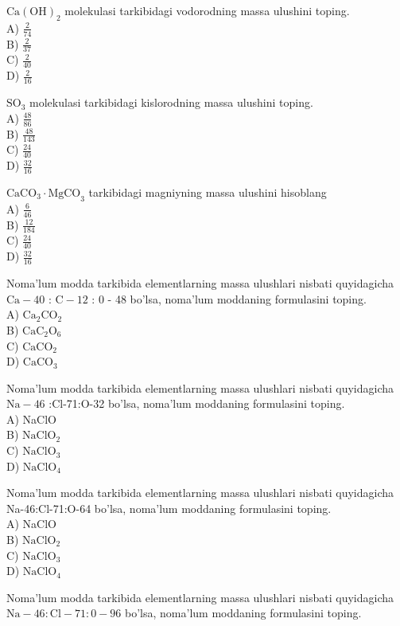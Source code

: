   \item $\mathrm{Ca}(\mathrm{OH})_{2}$ molekulasi tarkibidagi vodorodning massa ulushini toping.\\
A) $\frac{2}{74}$\\
B) $\frac{2}{37}$\\
C) $\frac{2}{40}$\\
D) $\frac{2}{16}$
  \item $\mathrm{SO}_{3}$ molekulasi tarkibidagi kislorodning massa ulushini toping.\\
A) $\frac{48}{86}$\\
B) $\frac{48}{143}$\\
C) $\frac{24}{40}$\\
D) $\frac{32}{16}$
  \item $\mathrm{CaCO}_{3} \cdot \mathrm{MgCO}_{3}$ tarkibidagi magniyning massa ulushini hisoblang\\
A) $\frac{6}{46}$\\
B) $\frac{12}{184}$\\
C) $\frac{24}{40}$\\
D) $\frac{32}{16}$
  \item Noma'lum modda tarkibida elementlarning massa ulushlari nisbati quyidagicha $\mathrm{Ca}-40$ : $\mathrm{C}-12$ : 0 - 48 bo'lsa, noma'lum moddaning formulasini toping.\\
A) $\mathrm{Ca}_{2} \mathrm{CO}_{2}$\\
B) $\mathrm{CaC}_{2} \mathrm{O}_{6}$\\
C) $\mathrm{CaCO}_{2}$\\
D) $\mathrm{CaCO}_{3}$
  \item Noma'lum modda tarkibida elementlarning massa ulushlari nisbati quyidagicha $\mathrm{Na}-46$ :Cl-71:O-32 bo'lsa, noma'lum moddaning formulasini toping.\\
A) NaClO\\
B) $\mathrm{NaClO}_{2}$\\
C) $\mathrm{NaClO}_{3}$\\
D) $\mathrm{NaClO}_{4}$
  \item Noma'lum modda tarkibida elementlarning massa ulushlari nisbati quyidagicha Na-46:Cl-71:O-64 bo'lsa, noma'lum moddaning formulasini toping.\\
A) NaClO\\
B) $\mathrm{NaClO}_{2}$\\
C) $\mathrm{NaClO}_{3}$\\
D) $\mathrm{NaClO}_{4}$
  \item Noma'lum modda tarkibida elementlarning massa ulushlari nisbati quyidagicha $\mathrm{Na}-46: \mathrm{Cl}-71: 0-96$ bo'lsa, noma'lum moddaning formulasini toping.\\
